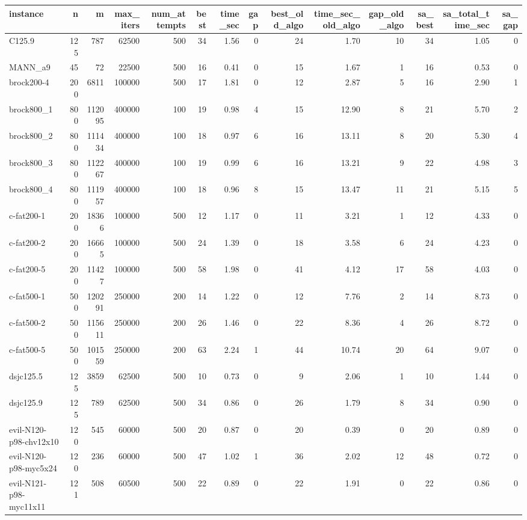 \begin{tabular}{lrrrrrrrrrrrrr}
\toprule
instance & n & m & max\_iters & num\_attempts & best & time\_sec & gap & best\_old\_algo & time\_sec\_old\_algo & gap\_old\_algo & sa\_best & sa\_total\_time\_sec & sa\_gap \\
\midrule
C125.9 & 125 & 787 & 62500 & 500 & 34 & 1.56 & 0 & 24 & 1.70 & 10 & 34 & 1.05 & 0 \\
MANN\_a9 & 45 & 72 & 22500 & 500 & 16 & 0.41 & 0 & 15 & 1.67 & 1 & 16 & 0.53 & 0 \\
brock200-4 & 200 & 6811 & 100000 & 500 & 17 & 1.81 & 0 & 12 & 2.87 & 5 & 16 & 2.90 & 1 \\
brock800\_1 & 800 & 112095 & 400000 & 100 & 19 & 0.98 & 4 & 15 & 12.90 & 8 & 21 & 5.70 & 2 \\
brock800\_2 & 800 & 111434 & 400000 & 100 & 18 & 0.97 & 6 & 16 & 13.11 & 8 & 20 & 5.30 & 4 \\
brock800\_3 & 800 & 112267 & 400000 & 100 & 19 & 0.99 & 6 & 16 & 13.21 & 9 & 22 & 4.98 & 3 \\
brock800\_4 & 800 & 111957 & 400000 & 100 & 18 & 0.96 & 8 & 15 & 13.47 & 11 & 21 & 5.15 & 5 \\
c-fat200-1 & 200 & 18366 & 100000 & 500 & 12 & 1.17 & 0 & 11 & 3.21 & 1 & 12 & 4.33 & 0 \\
c-fat200-2 & 200 & 16665 & 100000 & 500 & 24 & 1.39 & 0 & 18 & 3.58 & 6 & 24 & 4.23 & 0 \\
c-fat200-5 & 200 & 11427 & 100000 & 500 & 58 & 1.98 & 0 & 41 & 4.12 & 17 & 58 & 4.03 & 0 \\
c-fat500-1 & 500 & 120291 & 250000 & 200 & 14 & 1.22 & 0 & 12 & 7.76 & 2 & 14 & 8.73 & 0 \\
c-fat500-2 & 500 & 115611 & 250000 & 200 & 26 & 1.46 & 0 & 22 & 8.36 & 4 & 26 & 8.72 & 0 \\
c-fat500-5 & 500 & 101559 & 250000 & 200 & 63 & 2.24 & 1 & 44 & 10.74 & 20 & 64 & 9.07 & 0 \\
dsjc125.5 & 125 & 3859 & 62500 & 500 & 10 & 0.73 & 0 & 9 & 2.06 & 1 & 10 & 1.44 & 0 \\
dsjc125.9 & 125 & 789 & 62500 & 500 & 34 & 0.86 & 0 & 26 & 1.79 & 8 & 34 & 0.90 & 0 \\
evil-N120-p98-chv12x10 & 120 & 545 & 60000 & 500 & 20 & 0.87 & 0 & 20 & 0.39 & 0 & 20 & 0.89 & 0 \\
evil-N120-p98-myc5x24 & 120 & 236 & 60000 & 500 & 47 & 1.02 & 1 & 36 & 2.02 & 12 & 48 & 0.72 & 0 \\
evil-N121-p98-myc11x11 & 121 & 508 & 60500 & 500 & 22 & 0.89 & 0 & 22 & 1.91 & 0 & 22 & 0.86 & 0 \\

\end{tabular}
